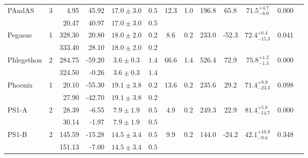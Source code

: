 \begin{tabular}{lcrrccccccccr}
	\multirow{2}{*}{PAndAS} & \multirow{2}{*}{3} & 4.95 & 45.92 & $17.0 \pm 3.0$ & $0.5$ & \multirow{2}{*}{12.3} & \multirow{2}{*}{1.0} & \multirow{2}{*}{196.8} & \multirow{2}{*}{65.8} & \multirow{2}{*}{$71.5^{+4.7}_{-6.0}$} & \multirow{2}{*}{0.000} & \multirow{2}{*}{\citet{Martin:2014}} \\
	 &  & 20.47 & 40.97 & $17.0 \pm 3.0$ & $0.5$ &  &  &  &  &  &  &  \\
	\multirow{2}{*}{Pegasus} & \multirow{2}{*}{1} & 328.30 & 20.80 & $18.0 \pm 2.0$ & $0.2$ & \multirow{2}{*}{8.6} & \multirow{2}{*}{0.2} & \multirow{2}{*}{233.0} & \multirow{2}{*}{-52.3} & \multirow{2}{*}{$72.4^{+6.4}_{-15.3}$} & \multirow{2}{*}{0.041} & \multirow{2}{*}{\citet{Perottoni:2019}} \\
	 &  & 333.40 & 28.10 & $18.0 \pm 2.0$ & $0.2$ &  &  &  &  &  &  &  \\
	\multirow{2}{*}{Phlegethon} & \multirow{2}{*}{2} & 284.75 & -59.20 & $3.6 \pm 0.3$ & $1.4$ & \multirow{2}{*}{66.6} & \multirow{2}{*}{1.4} & \multirow{2}{*}{526.4} & \multirow{2}{*}{72.9} & \multirow{2}{*}{$75.8^{+1.2}_{-1.3}$} & \multirow{2}{*}{0.000} & \multirow{2}{*}{\citet{Ibata:2018}} \\
	 &  & 324.50 & -0.26 & $3.6 \pm 0.3$ & $1.4$ &  &  &  &  &  &  &  \\
	\multirow{2}{*}{Phoenix} & \multirow{2}{*}{1} & 20.10 & -55.30 & $19.1 \pm 3.8$ & $0.2$ & \multirow{2}{*}{13.6} & \multirow{2}{*}{0.2} & \multirow{2}{*}{235.6} & \multirow{2}{*}{29.2} & \multirow{2}{*}{$71.4^{+9.9}_{-23.3}$} & \multirow{2}{*}{0.098} & \multirow{2}{*}{\citet{Shipp:2018}} \\
	 &  & 27.90 & -42.70 & $19.1 \pm 3.8$ & $0.2$ &  &  &  &  &  &  &  \\
	\multirow{2}{*}{PS1-A} & \multirow{2}{*}{2} & 28.39 & -6.55 & $7.9 \pm 1.9$ & $0.5$ & \multirow{2}{*}{4.9} & \multirow{2}{*}{0.2} & \multirow{2}{*}{249.3} & \multirow{2}{*}{22.9} & \multirow{2}{*}{$81.4^{+5.8}_{-14.7}$} & \multirow{2}{*}{0.000} & \multirow{2}{*}{\citet{Bernard:2016}} \\
	 &  & 30.14 & -1.97 & $7.9 \pm 1.9$ & $0.5$ &  &  &  &  &  &  &  \\
	\multirow{2}{*}{PS1-B} & \multirow{2}{*}{2} & 145.59 & -15.28 & $14.5 \pm 3.4$ & $0.5$ & \multirow{2}{*}{9.9} & \multirow{2}{*}{0.2} & \multirow{2}{*}{144.0} & \multirow{2}{*}{-24.2} & \multirow{2}{*}{$42.1^{+16.9}_{-9.6}$} & \multirow{2}{*}{0.348} & \multirow{2}{*}{\citet{Bernard:2016}} \\
	 &  & 151.13 & -7.00 & $14.5 \pm 3.4$ & $0.5$ &  &  &  &  &  &  &  \\

\end{tabular}
